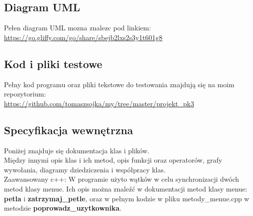 \documentclass[12pt,a4paper]{article}
\begin{document}
\subsection{Diagram UML}
 Pełen diagram UML mozna znalezc pod linkiem: \\
\url{https://go.gliffy.com/go/share/sbejb2lxs2s3y1t601g8}
\subsection{Kod i pliki testowe}
Pełny kod programu oraz pliki tekstowe do testowania znajdują się na moim repozytorium: \\
\url{https://github.com/tomaszsojka/my/tree/master/projekt_pk3}
\subsection{Specyfikacja wewnętrzna }

Poniżej znajduje się dokumentacja klas i plików. \\
Między innymi opis klas i ich metod, opis funkcji oraz operatorów, grafy wywołania, diagramy dziedziczenia i współpracy klas. \\
Zaawansowany c++:
W programie użyto wątków w celu synchronizacji dwóch metod klasy menue. Ich opis można znaleźć w dokumentacji metod klasy menue:  \textbf{petla} i \textbf{zatrzymaj\_petle}, oraz w pełnym kodzie w pliku metody\_menue.cpp w metodzie \textbf{poprowadz\_uzytkownika}.
\label{id:sec:specyfikacja}
\end{document}
